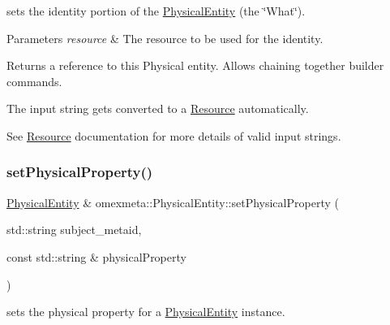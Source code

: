 sets the identity portion of the \hyperlink{classomexmeta_1_1PhysicalEntity}{Physical\+Entity} (the \char`\"{}\+What\char`\"{}). 


\begin{DoxyParams}{Parameters}
{\em resource} & The resource to be used for the identity. \\
\hline
\end{DoxyParams}
\begin{DoxyReturn}{Returns}
a reference to this Physical entity. Allows chaining together builder commands.
\end{DoxyReturn}
The input string gets converted to a \hyperlink{classomexmeta_1_1Resource}{Resource} automatically.

See \hyperlink{classomexmeta_1_1Resource}{Resource} documentation for more details of valid input strings. \mbox{\label{classomexmeta_1_1PhysicalEntity_a5d7168c527d2dbdacd612de37aa9a605}} 
\subsubsection{\texorpdfstring{set\+Physical\+Property()}{setPhysicalProperty()}\hspace{0.1cm}{\footnotesize\ttfamily [1/2]}}
{\footnotesize\ttfamily \hyperlink{classomexmeta_1_1PhysicalEntity}{Physical\+Entity} \& omexmeta\+::\+Physical\+Entity\+::set\+Physical\+Property (\begin{DoxyParamCaption}\item[{std\+::string}]{subject\+\_\+metaid,  }\item[{const std\+::string \&}]{physical\+Property }\end{DoxyParamCaption})}



sets the physical property for a \hyperlink{classomexmeta_1_1PhysicalEntity}{Physical\+Entity} instance. 


